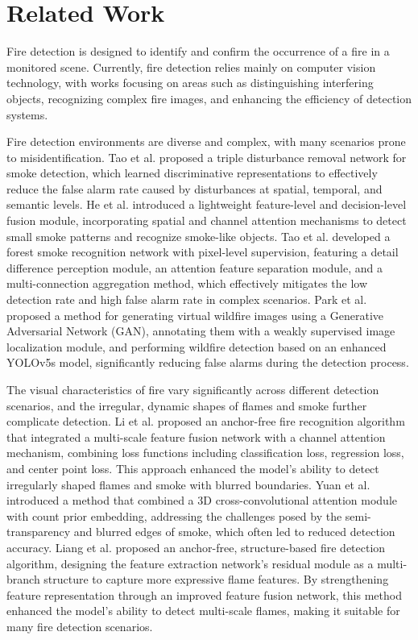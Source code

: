 \section{Related Work}
Fire detection is designed to identify and confirm the occurrence of a fire in a monitored scene. Currently, fire detection relies mainly on computer vision technology, with works focusing on areas such as distinguishing interfering objects, recognizing complex fire images, and enhancing the efficiency of detection systems.

Fire detection environments are diverse and complex, with many scenarios prone to misidentification. Tao et al. \cite{3tao2024} proposed a triple disturbance removal network for smoke detection, which learned discriminative representations to effectively reduce the false alarm rate caused by disturbances at spatial, temporal, and semantic levels. He et al. \cite{4he2021} introduced a lightweight feature-level and decision-level fusion module, incorporating spatial and channel attention mechanisms to detect small smoke patterns and recognize smoke-like objects. Tao et al. \cite{8tao2023} developed a forest smoke recognition network with pixel-level supervision, featuring a detail difference perception module, an attention feature separation module, and a multi-connection aggregation method, which effectively mitigates the low detection rate and high false alarm rate in complex scenarios. Park et al. \cite{9park2022} proposed a method for generating virtual wildfire images using a Generative Adversarial Network (GAN), annotating them with a weakly supervised image localization module, and performing wildfire detection based on an enhanced YOLOv5s model, significantly reducing false alarms during the detection process.

The visual characteristics of fire vary significantly across different detection scenarios, and the irregular, dynamic shapes of flames and smoke further complicate detection. Li et al. \cite{10li2023} proposed an anchor-free fire recognition algorithm that integrated a multi-scale feature fusion network with a channel attention mechanism, combining loss functions including classification loss, regression loss, and center point loss. This approach enhanced the model's ability to detect irregularly shaped flames and smoke with blurred boundaries. Yuan et al. \cite{11yuan2022} introduced a method that combined a 3D cross-convolutional attention module with count prior embedding, addressing the challenges posed by the semi-transparency and blurred edges of smoke, which often led to reduced detection accuracy. Liang et al. \cite{12laing2024} proposed an anchor-free, structure-based fire detection algorithm, designing the feature extraction network's residual module as a multi-branch structure to capture more expressive flame features. By strengthening feature representation through an improved feature fusion network, this method enhanced the model's ability to detect multi-scale flames, making it suitable for many fire detection scenarios.

